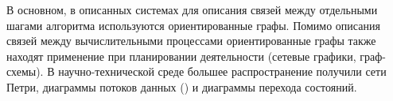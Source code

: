 В основном, в описанных системах для описания связей между отдельными шагами алгоритма используются ориентированные графы. Помимо описания связей между вычислительными процессами ориентированные графы также находят применение при планировании деятельности (сетевые графики, граф-схемы). В научно-технической среде большее распространение получили сети Петри, диаграммы потоков данных () и диаграммы перехода состояний.